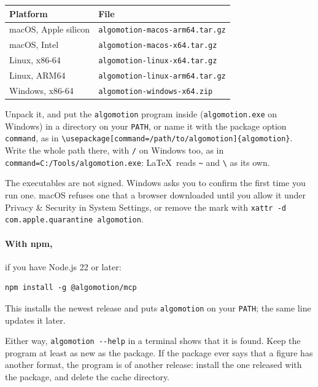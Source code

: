 \documentclass[11pt]{article}
\newcommand\cs[1]{\texttt{\textbackslash#1}}
\newcommand\key[1]{\texttt{#1}}
\begin{document}
\begin{center}
  \begin{tabular}{@{}ll@{}}
    \toprule
    Platform & File \\
    \midrule
    macOS, Apple silicon & \texttt{algomotion-macos-arm64.tar.gz} \\
    macOS, Intel & \texttt{algomotion-macos-x64.tar.gz} \\
    Linux, x86-64 & \texttt{algomotion-linux-x64.tar.gz} \\
    Linux, ARM64 & \texttt{algomotion-linux-arm64.tar.gz} \\
    Windows, x86-64 & \texttt{algomotion-windows-x64.zip} \\
    \bottomrule
  \end{tabular}
\end{center}

\noindent Unpack it, and put the \texttt{algomotion} program inside
(\texttt{algomotion.exe} on Windows) in a directory on your \texttt{PATH},
or name it with the package option \key{command}, as in
\cs{usepackage}\texttt{[command=/path/to/algomotion]\{algomotion\}}. Write
the whole path there, with \texttt{/} on Windows too, as in
\texttt{command=C:/Tools/algomotion.exe}: \LaTeX\ reads
\texttt{\textasciitilde} and \texttt{\textbackslash} as its own.

The executables are not signed. Windows asks you to confirm the first time
you run one. macOS refuses one that a browser downloaded until you allow it
under Privacy \& Security in System Settings, or remove the mark with
\texttt{xattr -d com.apple.quarantine algomotion}.

\paragraph{With npm,} if you have Node.js 22 or later:

\begin{lstlisting}
npm install -g @algomotion/mcp
\end{lstlisting}

\noindent This installs the newest release and puts \texttt{algomotion} on
your \texttt{PATH}; the same line updates it later.

Either way, \texttt{algomotion -{}-help} in a terminal shows that it is
found. Keep the program at least as new as the package. If the package ever
says that a figure has another format, the program is of another release:
install the one released with the package, and delete the cache directory.
\end{document}
